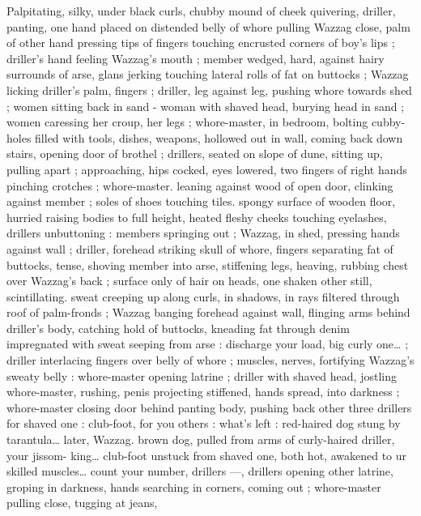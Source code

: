 Palpitating, silky, under black curls, chubby mound of cheek 
quivering, driller, panting, one hand placed on distended belly of 
whore pulling Wazzag close, palm of other hand pressing tips of 
fingers touching encrusted corners of boy's lips ; driller's hand 
feeling Wazzag's mouth ; member wedged, hard, against hairy 
surrounds of arse, glans jerking touching lateral rolls of fat on 
buttocks ; Wazzag licking driller's palm, fingers ; driller, leg against 
leg, pushing whore towards shed ; women sitting back in sand - 
woman with shaved head, burying head in sand ; women caressing 
her croup, her legs ; whore-master, in bedroom, bolting cubby-holes 
filled with tools, dishes, weapons, hollowed out in wall, coming back 
down stairs, opening door of brothel ; drillers, seated on slope of 
dune, sitting up, pulling apart ; approaching, hips cocked, eyes 
lowered, two fingers of right hands pinching crotches ; whore-master. 
leaning against wood of open door, clinking against member ; soles 
of shoes touching tiles. spongy surface of wooden floor, hurried 
raising bodies to full height, heated fleshy cheeks touching 
eyelashes, drillers unbuttoning : members springing out ; Wazzag, in 
shed, pressing hands against wall ; driller, forehead striking skull of 
whore, fingers separating fat of buttocks, tense, shoving member 
into arse, stiffening legs, heaving, rubbing chest over Wazzag's back 
; surface only of hair on heads, one shaken other still, scintillating. 
sweat creeping up along curls, in shadows, in rays filtered through 
roof of palm-fronds ; Wazzag banging forehead against wall, flinging 
arms behind driller's body, catching hold of buttocks, kneading fat 
through denim impregnated with sweat seeping from arse :{\td} {\gl}{\td} 
discharge your load, big curly one{\ldots}{\gr} ; driller interlacing fingers over 
belly of whore ; muscles, nerves, fortifying Wazzag's sweaty belly : 
whore-master opening latrine ; driller with shaved head, jostling 
whore-master, rushing, penis projecting stiffened, hands spread, into 
darkness ; whore-master closing door behind panting body, pushing 
back other three drillers{\td} {\gl} for shaved one : club-foot, for you others 
: what's left : red-haired dog stung by tarantula{\ldots} later, Wazzag. 
brown dog, pulled from arms of curly-haired driller, your jissom- 
king{\ldots} club-foot unstuck from shaved one, both hot, awakened to 
ur skilled muscles{\ldots} count your number, drillers{\td} {\gr} ---, drillers 
opening other latrine, groping in darkness, hands searching in 
corners, coming out ; whore-master pulling close, tugging at jeans, 
